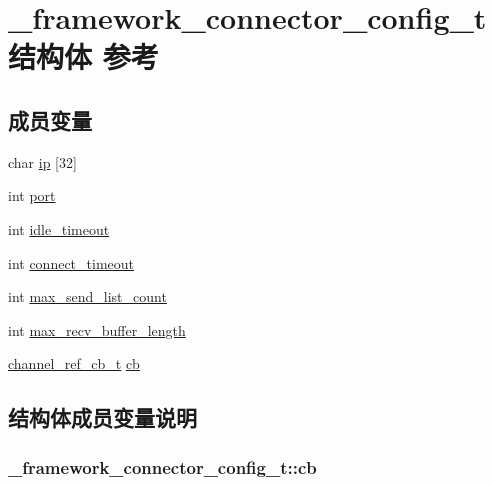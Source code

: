 \hypertarget{a00011}{}\section{\+\_\+framework\+\_\+connector\+\_\+config\+\_\+t结构体 参考}
\label{a00011}
\subsection*{成员变量}
\begin{DoxyCompactItemize}
\item 
char \hyperlink{a00011_a09a135e761eb026e64952e76ca193c1b_a09a135e761eb026e64952e76ca193c1b}{ip} \mbox{[}32\mbox{]}
\item 
int \hyperlink{a00011_a5427527be42630baf3fc0497e74e4d4d_a5427527be42630baf3fc0497e74e4d4d}{port}
\item 
int \hyperlink{a00011_a103e36450fc30baa72acc26b7efd5b98_a103e36450fc30baa72acc26b7efd5b98}{idle\+\_\+timeout}
\item 
int \hyperlink{a00011_a02f7315d98e5e2872fde99130da6b7c8_a02f7315d98e5e2872fde99130da6b7c8}{connect\+\_\+timeout}
\item 
int \hyperlink{a00011_ac6e964a4a4ca24a176016275955a4e05_ac6e964a4a4ca24a176016275955a4e05}{max\+\_\+send\+\_\+list\+\_\+count}
\item 
int \hyperlink{a00011_a7f803ef991aaf690e9b3585c423511d1_a7f803ef991aaf690e9b3585c423511d1}{max\+\_\+recv\+\_\+buffer\+\_\+length}
\item 
\hyperlink{a00051_ae296ec4d1ce108960de8dcc423956a1d_ae296ec4d1ce108960de8dcc423956a1d}{channel\+\_\+ref\+\_\+cb\+\_\+t} \hyperlink{a00011_a7aeae2c4a7d06ea452374fb40434e1c7_a7aeae2c4a7d06ea452374fb40434e1c7}{cb}
\end{DoxyCompactItemize}


\subsection{结构体成员变量说明}
\hypertarget{a00011_a7aeae2c4a7d06ea452374fb40434e1c7_a7aeae2c4a7d06ea452374fb40434e1c7}{}
\subsubsection[{cb}]{ \+\_\+framework\+\_\+connector\+\_\+config\+\_\+t\+::cb}\label{a00011_a7aeae2c4a7d06ea452374fb40434e1c7_a7aeae2c4a7d06ea452374fb40434e1c7}
\hypertarget{a00011_a02f7315d98e5e2872fde99130da6b7c8_a02f7315d98e5e2872fde99130da6b7c8}{}
